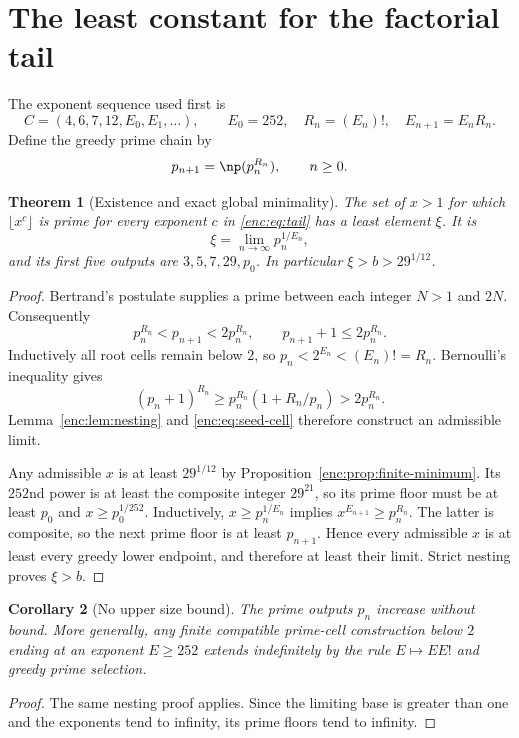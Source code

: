 \documentclass[11pt,a4paper]{article}
\newtheorem{theorem}{Theorem}[section]
\newtheorem{corollary}[theorem]{Corollary}
\theoremstyle{definition}
\theoremstyle{remark}
\numberwithin{equation}{section}
\begin{document}
\section{The least constant for the factorial tail}
The exponent sequence used first is
\begin{equation}\label{enc:eq:tail}
C=(4,6,7,12,E_0,E_1,\ldots),\qquad
E_0=252,\quad R_n=(E_n)!,\quad E_{n+1}=E_nR_n.
\end{equation}
Define the greedy prime chain by
\begin{equation}\label{enc:eq:greedy-chain}
p_{n+1}=\np(p_n^{R_n}),\qquad n\ge0.
\end{equation}

\begin{theorem}[Existence and exact global minimality]\label{enc:thm:greedy}
The set of $x>1$ for which $\lfloor x^c\rfloor$ is prime for every exponent $c$ in \eqref{enc:eq:tail} has a least element $\xi$. It is
\[
\xi=\lim_{n\to\infty}p_n^{1/E_n},
\]
and its first five outputs are $3,5,7,29,p_0$. In particular $\xi>b>29^{1/12}$.
\end{theorem}
\begin{proof}
Bertrand's postulate supplies a prime between each integer $N>1$ and $2N$. Consequently
\[
p_n^{R_n}<p_{n+1}<2p_n^{R_n},\qquad
p_{n+1}+1\le2p_n^{R_n}.
\]
Inductively all root cells remain below $2$, so $p_n<2^{E_n}<(E_n)!=R_n$. Bernoulli's inequality gives
\[
(p_n+1)^{R_n}\ge p_n^{R_n}(1+R_n/p_n)>2p_n^{R_n}.
\]
Lemma~\ref{enc:lem:nesting} and \eqref{enc:eq:seed-cell} therefore construct an admissible limit.

Any admissible $x$ is at least $29^{1/12}$ by Proposition~\ref{enc:prop:finite-minimum}. Its $252$nd power is at least the composite integer $29^{21}$, so its prime floor must be at least $p_0$ and $x\ge p_0^{1/252}$. Inductively, $x\ge p_n^{1/E_n}$ implies $x^{E_{n+1}}\ge p_n^{R_n}$. The latter is composite, so the next prime floor is at least $p_{n+1}$. Hence every admissible $x$ is at least every greedy lower endpoint, and therefore at least their limit. Strict nesting proves $\xi>b$.
\end{proof}

\begin{corollary}[No upper size bound]
The prime outputs $p_n$ increase without bound. More generally, any finite compatible prime-cell construction below $2$ ending at an exponent $E\ge252$ extends indefinitely by the rule $E\mapsto EE!$ and greedy prime selection.
\end{corollary}
\begin{proof}
The same nesting proof applies. Since the limiting base is greater than one and the exponents tend to infinity, its prime floors tend to infinity.
\end{proof}
\end{document}
